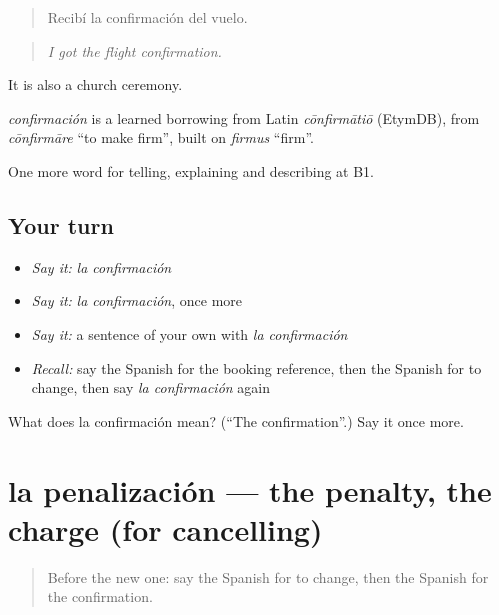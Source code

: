 \begin{quote}
Recibí la confirmación del vuelo.
\end{quote}

\begin{quote}
\emph{I got the flight confirmation.}
\end{quote}

It is also a church ceremony.

\begin{cousinweb}
\emph{confirmación} is a learned borrowing from Latin \emph{cōnfirmātiō} (EtymDB), from \emph{cōnfirmāre} \textquotedblleft{}to make firm\textquotedblright{}, built on \emph{firmus} \textquotedblleft{}firm\textquotedblright{}.
\end{cousinweb}

\begin{grammarlens}[title={What you've built}]
One more word for telling, explaining and describing at B1.
\end{grammarlens}

\subsection*{Your turn}
\begin{itemize}
\raggedright
  \item \emph{Say it:} \emph{la confirmación}
  \item \emph{Say it:} \emph{la confirmación}, once more
  \item \emph{Say it:} a sentence of your own with \emph{la confirmación}
  \item \emph{Recall:} say the Spanish for the booking reference, then the Spanish for to change, then say \emph{la confirmación} again
\end{itemize}

\begin{tcolorbox}[breakable,colback=teal!4,colframe=teal!35!black,title={Before you move on}]
What does la confirmación mean? (\textquotedblleft{}The confirmation\textquotedblright{}.) Say it once more.
\end{tcolorbox}
\section[la penalización]{la penalización — the penalty, the charge (for cancelling)}

\label{lesson:ES-C662-penalizacion}



\begin{quote}
Before the new one: say the Spanish for to change, then the Spanish for the confirmation.
\end{quote}

